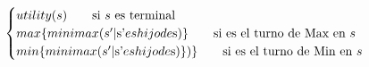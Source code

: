 \documentclass[preview]{standalone}
\begin{document}
\begin{align*}
\begin{cases}
                                 utility(s) \qquad \text{si $s$ es terminal} \cr
                                 max\{minimax(\text{$s'$}| $s'$ es hijo de $s$)\}\qquad \text{si es el turno de Max en $s$} \cr
                                 min\{minimax(\text{$s'$}| $s'$ es hijo de $s$)\})\}\qquad \text{si es el turno de Min en $s$} \cr
                                 \end{cases}
\end{align*}
\end{document}
